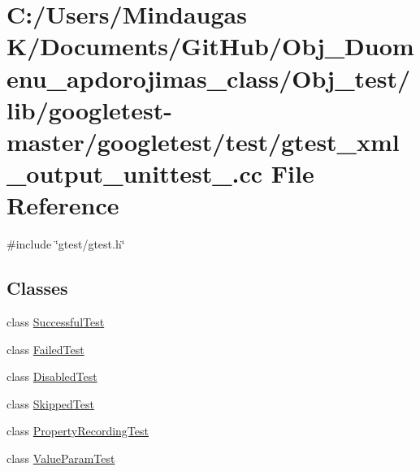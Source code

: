 \hypertarget{_obj__test_2lib_2googletest-master_2googletest_2test_2gtest__xml__output__unittest___8cc}{}\section{C\+:/\+Users/\+Mindaugas K/\+Documents/\+Git\+Hub/\+Obj\+\_\+\+Duomenu\+\_\+apdorojimas\+\_\+class/\+Obj\+\_\+test/lib/googletest-\/master/googletest/test/gtest\+\_\+xml\+\_\+output\+\_\+unittest\+\_\+.cc File Reference}
\label{_obj__test_2lib_2googletest-master_2googletest_2test_2gtest__xml__output__unittest___8cc}
{\ttfamily \#include \char`\"{}gtest/gtest.\+h\char`\"{}}\newline
\subsection*{Classes}
\begin{DoxyCompactItemize}
\item 
class \mbox{\hyperlink{class_successful_test}{Successful\+Test}}
\item 
class \mbox{\hyperlink{class_failed_test}{Failed\+Test}}
\item 
class \mbox{\hyperlink{class_disabled_test}{Disabled\+Test}}
\item 
class \mbox{\hyperlink{class_skipped_test}{Skipped\+Test}}
\item 
class \mbox{\hyperlink{class_property_recording_test}{Property\+Recording\+Test}}
\item 
class \mbox{\hyperlink{class_value_param_test}{Value\+Param\+Test}}
\end{DoxyCompactItemize}
